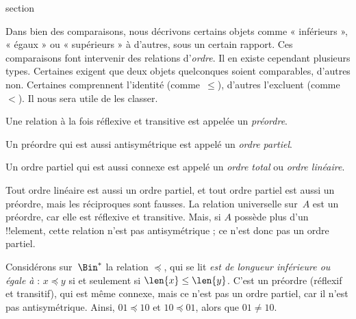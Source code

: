 \documentclass[11pt,a4paper,openany]{memoir}
\begin{document}
\begingroup
\expandafter\def\csname ol@sectioncs\endcsname{section}
\def\olfilename{orders}



\begin{explain}
Dans bien des comparaisons, nous décrivons certains objets comme
« inférieurs », « égaux » ou « supérieurs » à d’autres, sous un certain
rapport. Ces comparaisons font intervenir des relations d’\emph{ordre}.
Il en existe cependant plusieurs types. Certaines exigent que deux objets
quelconques soient comparables, d’autres non. Certaines comprennent
l’identité (comme~$\le$), d’autres l’excluent (comme~$<$).
Il nous sera utile de les classer.
\end{explain}

\begin{defn}[Préordre]
Une relation à la fois réflexive et transitive est appelée un
\emph{préordre}.
\end{defn}

\begin{defn}
Un préordre qui est aussi antisymétrique est appelé un \emph{ordre partiel}.
\end{defn}

\begin{defn}
Un ordre partiel qui est aussi connexe est appelé un \emph{ordre total}
ou \emph{ordre linéaire}.
\end{defn}

\begin{ex}
Tout ordre linéaire est aussi un ordre partiel, et tout ordre partiel
est aussi un préordre, mais les réciproques sont fausses.
La relation universelle sur~$A$ est un préordre, car elle est réflexive
et transitive. Mais, si $A$ possède plus d’un !!{element}, cette relation
n’est pas antisymétrique ; ce n’est donc pas un ordre partiel.
\end{ex}

\begin{ex}
Considérons sur~$\Bin^*$ la relation $\preccurlyeq$, qui se lit
\emph{est de longueur inférieure ou égale à} : $x \preccurlyeq y$ si et
seulement si $\len{x} \le \len{y}$. C’est un préordre (réflexif et
transitif), qui est même connexe, mais ce n’est pas un ordre partiel,
car il n’est pas antisymétrique. Ainsi, $01 \preccurlyeq 10$ et
$10 \preccurlyeq 01$, alors que $01 \neq 10$.
\end{ex}
\end{document}
